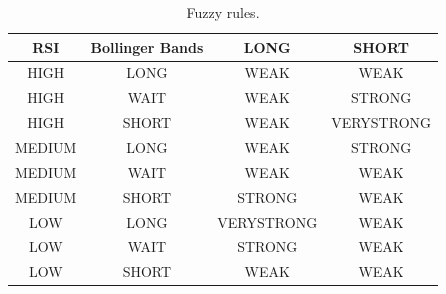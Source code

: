 \documentclass{article}
\begin{document}
\begin{table}[htp]
	\centering
	\begin{tabular}{c c c c}
		\toprule
        {RSI} & {Bollinger Bands} & {LONG} & {SHORT} \\ 
        \midrule
        HIGH & LONG & WEAK & WEAK \\
        HIGH & WAIT & WEAK & STRONG \\
        HIGH & SHORT & WEAK & VERYSTRONG \\
        MEDIUM & LONG & WEAK & STRONG \\
        MEDIUM & WAIT & WEAK & WEAK \\
        MEDIUM & SHORT & STRONG & WEAK \\
        LOW & LONG & VERYSTRONG & WEAK \\
        LOW & WAIT & STRONG & WEAK \\
        LOW & SHORT & WEAK & WEAK \\
        \bottomrule
    \end{tabular} 
    \caption{Fuzzy rules.}
	\label{table:3}
\end{table}

\newpage
\printbibliography
\end{document}
